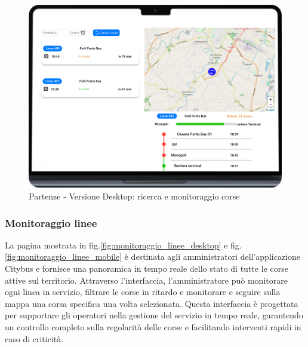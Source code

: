 \begin{figure}[H]
  \centering
  \includegraphics[width=\textwidth]{images/mockup/Ricerca Linee Desktop.png}
  \caption{Partenze - Versione Desktop: ricerca e monitoraggio corse}
  \label{fig:partenze-desktop}
\end{figure}

\subsubsection{Monitoraggio linee}

La pagina mostrata in fig.\ref{fig:monitoraggio_linee_desktop} e fig.\ref{fig:monitoraggio_linee_mobile}  è destinata agli amministratori dell’applicazione Citybus e fornisce una panoramica in tempo reale dello stato di tutte le corse attive sul territorio. Attraverso l’interfaccia, l’amministratore può monitorare ogni linea in servizio, filtrare le corse in ritardo e monitorare e seguire sulla mappa una corsa specifica una volta selezionata.
Questa interfaccia è progettata per supportare gli operatori nella gestione del servizio in tempo reale, garantendo un controllo completo sulla regolarità delle corse e facilitando interventi rapidi in caso di criticità.

